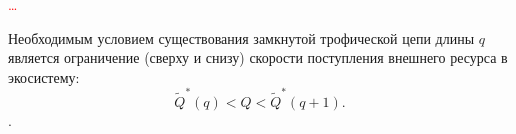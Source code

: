 
        \textcolor{red}{\dots}

        \begin{corollary}
            Необходимым условием существования замкнутой трофической цепи длины \(q\) является ограничение (сверху и снизу) скорости поступления внешнего ресурса в экосистему:
            \begin{equation}
                \widetilde{Q}^*(q) < Q < \widetilde{Q}^*(q+1).
            \end{equation}.
        \end{corollary}
        



